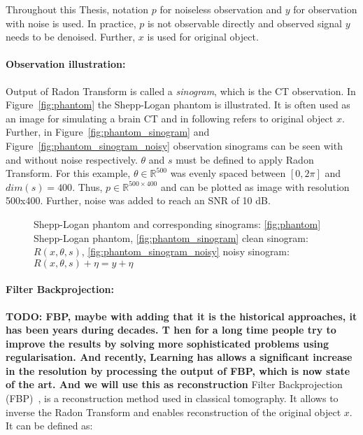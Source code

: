 \begin{tcolorbox}[colback=red!5!white,colframe=red!75!black]
    Throughout this Thesis, notation $p$ for noiseless observation and $y$ for observation with noise is used.
    In practice, $p$ is not observable directly and observed signal $y$ needs to be denoised.
    Further, $x$ is used for original object.
\end{tcolorbox}

\paragraph{Observation illustration:}

Output of Radon Transform is called a \textit{sinogram}, which is the CT observation.
In Figure~\ref{fig:phantom} the Shepp-Logan phantom is illustrated.
It is often used as an image for simulating a brain CT and in following refers to original object $x$. 
Further, in Figure~\ref{fig:phantom_sinogram} and Figure~\ref{fig:phantom_sinogram_noisy} 
observation sinograms can be seen with and without noise respectively. 
$\theta$ and $s$ must be defined to apply Radon Transform.
For this example, $\theta \in \mathbb{R}^{500}$ was evenly spaced
between $[0, 2 \pi]$ and $dim(s) = 400$. 
Thus, $p \in \mathbb{R}^{500 \times 400}$ and can be plotted as image with resolution 500x400. 
Further, noise was added to reach an SNR of 10 dB.

\begin{figure}[H]
    \label{fig:phantom_and_sinos}
    \hfill
    \hfill
    \hfill
    \hfill
	\caption{Shepp-Logan phantom and corresponding sinograms:
    \ref{fig:phantom} Shepp-Logan phantom,
    \ref{fig:phantom_sinogram} clean sinogram: $R(x, \theta, s)$,
    \ref{fig:phantom_sinogram_noisy} noisy sinogram: $R(x, \theta, s) + \eta = y + \eta$ 
    }
\end{figure}

\paragraph{Filter Backprojection:}
\textbf{TODO: FBP, maybe with adding that it is the historical approaches, it has been years during decades. T
hen for a long time people try to improve the results by solving more sophisticated problems using regularisation. 
And recently, Learning has allows a significant increase in the resolution by processing the output of FBP, which is now state of the art. 
And we will use this as reconstruction
}
Filter Backprojection (FBP)~\cite{tomographicReconstruction}, 
is a reconstruction method used in classical tomography.
It allows to inverse the Radon Transform and enables reconstruction of the original object $x$.
It can be defined as:

